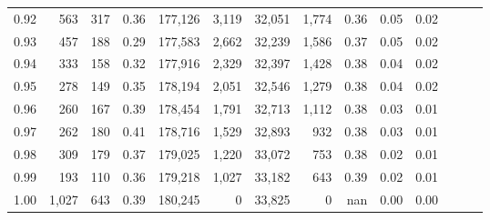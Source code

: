 \begin{tabular}{rrrrrrrrrrrrrr}
0.92 &    563 &  317 &  0.36 &  177,126 &    3,119 &  32,051 &   1,774 &  0.36 &  0.05 &      0.02 \\
0.93 &    457 &  188 &  0.29 &  177,583 &    2,662 &  32,239 &   1,586 &  0.37 &  0.05 &      0.02 \\
0.94 &    333 &  158 &  0.32 &  177,916 &    2,329 &  32,397 &   1,428 &  0.38 &  0.04 &      0.02 \\
0.95 &    278 &  149 &  0.35 &  178,194 &    2,051 &  32,546 &   1,279 &  0.38 &  0.04 &      0.02 \\
0.96 &    260 &  167 &  0.39 &  178,454 &    1,791 &  32,713 &   1,112 &  0.38 &  0.03 &      0.01 \\
0.97 &    262 &  180 &  0.41 &  178,716 &    1,529 &  32,893 &     932 &  0.38 &  0.03 &      0.01 \\
0.98 &    309 &  179 &  0.37 &  179,025 &    1,220 &  33,072 &     753 &  0.38 &  0.02 &      0.01 \\
0.99 &    193 &  110 &  0.36 &  179,218 &    1,027 &  33,182 &     643 &  0.39 &  0.02 &      0.01 \\
1.00 &  1,027 &  643 &  0.39 &  180,245 &        0 &  33,825 &       0 &   nan &  0.00 &      0.00 \\
\bottomrule
\end{tabular}
